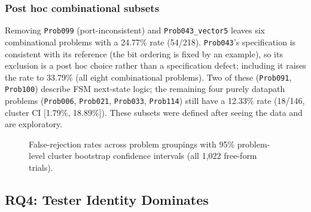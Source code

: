 \documentclass[conference]{IEEEtran}
\begin{document}
\subsubsection{Post hoc combinational subsets}
Removing \texttt{Prob099} (port-inconsistent) and \texttt{Prob043\_vector5} leaves six combinational problems with a 24.77\% rate (54/218). \texttt{Prob043}'s specification is consistent with its reference (the bit ordering is fixed by an example), so its exclusion is a post hoc choice rather than a specification defect; including it raises the rate to 33.79\% (all eight combinational problems). Two of these (\texttt{Prob091}, \texttt{Prob100}) describe FSM next-state logic; the remaining four purely datapath problems (\texttt{Prob006}, \texttt{Prob021}, \texttt{Prob033}, \texttt{Prob114}) still have a 12.33\% rate (18/146, cluster CI [1.79\%, 18.89\%]). These subsets were defined after seeing the data and are exploratory.

\begin{figure}[t]
\centering
{}
\caption{False-rejection rates across problem groupings with 95\% problem-level cluster bootstrap confidence intervals (all 1,022 free-form trials).}
\label{fig:rates_chart}
\end{figure}

\subsection{RQ4: Tester Identity Dominates}
\end{document}
